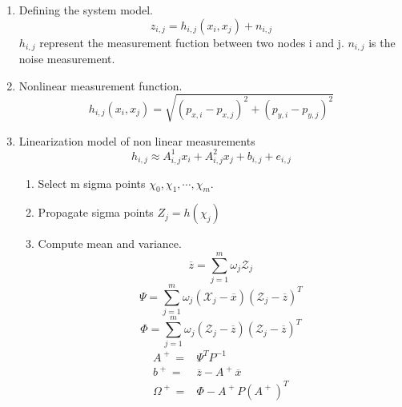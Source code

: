 \documentclass[12pt]{article}
\begin{document}
\begin{enumerate}
\item Defining the system model.
	\begin{equation}
z_{i,j}=h_{i,j}(x_{i},x_{j})+n_{i,j}
\end{equation}
$h_{i,j}$ represent the measurement fuction between two nodes i and j. $n_{i,j}$ is the noise measurement. \\

\item Nonlinear measurement function.
	\begin{equation}
	h_{i,j}(x_{i},x_{j})=\sqrt{(p_{x,i}-p_{x,j})^{2}+(p_{y,i}-p_{y,j})^{2}}
	\end{equation}

\item Linearization model of non linear measurements
\begin{equation}
h_{i,j} \approx A_{i,j}^{1}x_{i}+A_{i,j}^{2}x_{j}+b_{i,j}+e_{i,j}
\end{equation}

\begin{enumerate}
\item Select m sigma points $\chi_{0},\chi_{1},\cdots,\chi_{m}$.
\item Propagate sigma points $Z_{j}=h(\chi_{j})$
\item Compute mean and variance.
\begin{equation}

\overline{z}=\sum _{j=1}^{m}\omega _{j}\mathcal {Z}_{j}
\end{equation}
\begin{equation}
\Psi =\sum _{j=1}^{m}\omega _{j}\left(\mathcal
 {X}_{j}-\overline{x}\right)\left(\mathcal {Z}_{j}-\overline{z}\right)^{T}
\end{equation}
\begin{equation}
\Phi =\sum _{j=1}^{m}\omega _{j}\left(\mathcal {Z}_{j}-\overline{z}\right)\left(\mathcal {Z}_{j}-\overline{z}\right)^{T}
\end{equation}
\begin{equation}
\begin{split}
 A^{\;+\;}=&\Psi ^{T}P^{-1} \\
 b^{\;+\;}=&\overline{z}-A^{\;+\;}\overline{x}\\
 \Omega ^{\;+\;}=&\Phi -A^{\;+\;}P\left(A^{\;+\;}\right)^{T}
 \end{split}
\end{equation}
\end{enumerate}



\end{enumerate}
\end{document}
